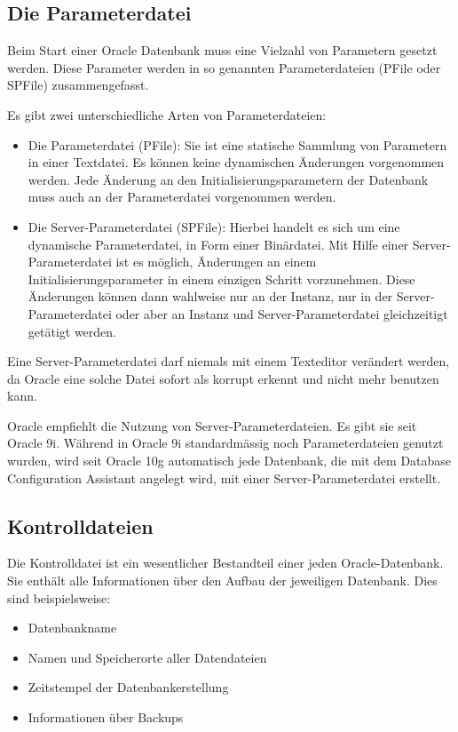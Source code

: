         \subsection{Die Parameterdatei}
          Beim Start einer Oracle Datenbank muss eine Vielzahl von Parametern gesetzt werden. Diese Parameter werden in so genannten Parameterdateien (PFile oder SPFile) zusammengefasst.

          Es gibt zwei unterschiedliche Arten von Parameterdateien:

          \begin{itemize}
            \item Die Parameterdatei (PFile): Sie ist eine statische Sammlung von Parametern in einer Textdatei. Es können keine dynamischen Änderungen vorgenommen werden. Jede Änderung an den Initialisierungsparametern der Datenbank muss auch an der Parameterdatei vorgenommen werden.
            \item Die Server-Parameterdatei (SPFile): Hierbei handelt es sich um eine dynamische Parameterdatei, in Form einer Binärdatei. Mit Hilfe einer Server-Parameterdatei ist es möglich, Änderungen an einem Initialisierungsparameter in einem einzigen Schritt vorzunehmen. Diese Änderungen können dann wahlweise nur an der Instanz, nur in der Server-Parameterdatei oder aber an Instanz und Server-Parameterdatei gleichzeitigt getätigt werden.
          \end{itemize}

          \begin{merke}
            Eine Server-Parameterdatei darf niemals mit einem Texteditor verändert werden, da Oracle eine solche Datei sofort als korrupt erkennt und nicht mehr benutzen kann.
          \end{merke}

          Oracle empfiehlt die Nutzung von Server-Parameterdateien. Es gibt sie seit Oracle 9i. Während in Oracle 9i standardmässig noch Parameterdateien genutzt wurden, wird seit Oracle 10g automatisch jede Datenbank, die mit dem Database Configuration Assistant angelegt wird, mit einer Server-Parameterdatei erstellt.
       \subsection{Kontrolldateien}
        Die Kontrolldatei ist ein wesentlicher Bestandteil einer jeden Oracle-Datenbank. Sie enthält alle  Informationen über den Aufbau der jeweiligen Datenbank. Dies sind beispielsweise:
          \begin{itemize}
            \item Datenbankname
            \item Namen und Speicherorte aller Datendateien
            \item Zeitstempel der Datenbankerstellung
            \item Informationen über Backups
          \end{itemize}

